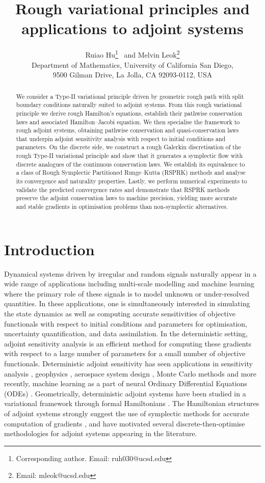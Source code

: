 \documentclass[11pt, oneside]{article}
\title{Rough variational principles and applications to adjoint systems}
\author{Ruiao Hu\footnote{Corresponding author. Email: ruh030@ucsd.edu} ~and Melvin Leok\footnote{Email: mleok@ucsd.edu} \vspace{0.4cm}\\
Department of Mathematics, University of California San Diego,\\  9500 Gilman Drive, La Jolla, CA 92093-0112, USA}
\date{}
\numberwithin{equation}{section}
\theoremstyle{definition}
\begin{document}
\maketitle

\begin{abstract}
We consider a Type-II variational principle driven by geometric rough path with split boundary conditions naturally suited to adjoint systems. From this rough variational principle we derive rough Hamilton's equations, establish their pathwise conservation laws and associated Hamilton–Jacobi equation. We then specialise the framework to rough adjoint systems, obtaining pathwise conservation and quasi-conservation laws that underpin adjoint sensitivity analysis with respect to initial conditions and parameters. On the discrete side, we construct a rough Galerkin discretisation of the rough Type-II variational principle and show that it generates a symplectic flow with discrete analogues of the continuous conservation laws. We establish its equivalence to a class of Rough Symplectic Partitioned Runge–Kutta (RSPRK) methods and analyse its convergence and naturality properties. Lastly, we perform numerical experiments to validate the predicted convergence rates and demonstrate that RSPRK methods preserve the adjoint conservation laws to machine precision, yielding more accurate and stable gradients in optimisation problems than non-symplectic alternatives.
\end{abstract}

\tableofcontents
\section{Introduction}
Dynamical systems driven by irregular and random signals naturally appear in a wide range of applications including multi-scale modelling and machine learning where the primary role of these signals is to model unknown or under-resolved quantities. In these applications, one is simultaneously interested in simulating the state dynamics as well as computing accurate sensitivities of objective functionals with respect to initial conditions and parameters for optimisation, uncertainty quantification, and data assimilation. In the deterministic setting, adjoint sensitivity analysis is an efficient method for computing these gradients with respect to a large number of parameters for a small number of objective functionals. Deterministic adjoint sensitivity has seen applications in sensitivity analysis \cite{Cacuci1981, Cao2003}, geophysics \cite{Plessix2006}, aerospace system design \cite{giles2000introduction}, Monte Carlo methods \cite{Caflisch2021} and more recently, machine learning as a part of neural Ordinary Differential Equations (ODEs) \cite{Chen2019, matsubara2021symplectic}. Geometrically, deterministic adjoint systems have been studied in a variational framework through formal Hamiltonians \cite{Ibragimov2007, TL2024}. The Hamiltonian structures of adjoint systems strongly suggest the use of symplectic methods for accurate computation of gradients \cite{Sanz-Serna2016}, and have motivated several discrete-then-optimise methodologies for adjoint systems appearing in the literature.
\end{document}

